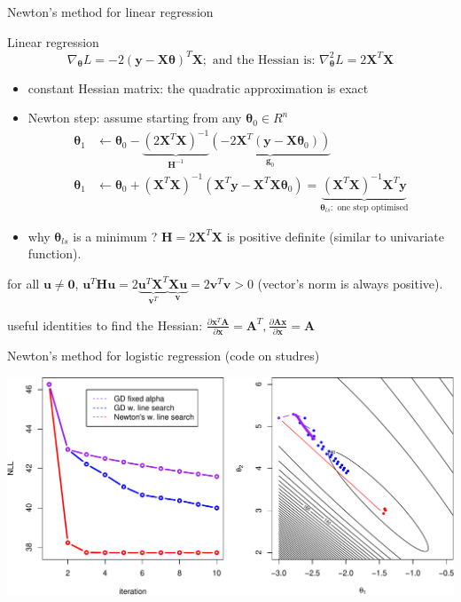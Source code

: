 \documentclass[ignorenonframetext,aspectratio=169]{beamer}
\newcommand{\vv}[1]{\boldsymbol{#1}}
\begin{document}
\begin{frame}{Newton's method for linear regression}
\protect\hypertarget{newtons-method-for-linear-regression}{}

Linear regression
\[\nabla_{\vv{\theta}}L= -2(\vv{y}-\vv{X\theta})^T\vv{X};\text{ and the Hessian is: } \nabla^2_{\vv{\theta}}L = 2\vv{X}^T\vv{X}\]

\begin{itemize}
\item
  constant Hessian matrix: the quadratic approximation is exact
\item
  Newton step: assume starting from any \(\vv{\theta}_0 \in R^n\)
  \begin{align*}\vv{\theta}_1 &\leftarrow \vv{\theta}_0 - \underbrace{(2\vv{X}^T\vv{X})^{-1}}_{\vv{H}^{-1}}\underbrace{ (-2\vv{X}^T(\vv{y}-\vv{X\theta}_0) )}_{\vv{g}_0} \\
   \vv{\theta}_1 &\leftarrow \vv{\theta}_0 + (\vv{X}^T\vv{X})^{-1}(\vv{X}^T\vv{y} -\vv{X}^T\vv{X}\vv{\theta}_0) =  \underbrace{(\vv{X}^T\vv{X})^{-1}\vv{X}^T\vv{y}}_{\vv{\theta}_{ls}: \text{ one step optimised}}
    \end{align*}
\item
  why \(\vv{\theta}_{ls}\) is a minimum ? \(\vv{H}= 2\vv{X}^T\vv{X}\) is
  positive definite (similar to univariate function).
\end{itemize}

\footnotesize  for all \(\vv{u}\neq \vv{0}\),
\(\vv{u}^T\vv{H}\vv{u}=2\underbrace{\vv{u}^T\vv{X}^T}_{\vv{v}^T}\underbrace{\vv{X}\vv{u}}_{\vv{v}}= 2\vv{v}^T\vv{v}>0\)
(vector's norm is always positive).

\footnotesize useful identities to find the Hessian:
\(\frac{\partial \vv{x}^T \vv{A}}{\partial \vv{x}} = \vv{A}^{T}, \frac{\partial \vv{Ax}}{\partial \vv{x}} = \vv{A}\)

\end{frame}

\begin{frame}{Newton's method for logistic regression (code on studres)}
\protect\hypertarget{newtons-method-for-logistic-regression-code-on-studres}{}

\begin{center}\includegraphics[width=1\linewidth]{lecture9_files/figure-beamer/unnamed-chunk-11-1} \end{center}

\end{frame}
\end{document}
